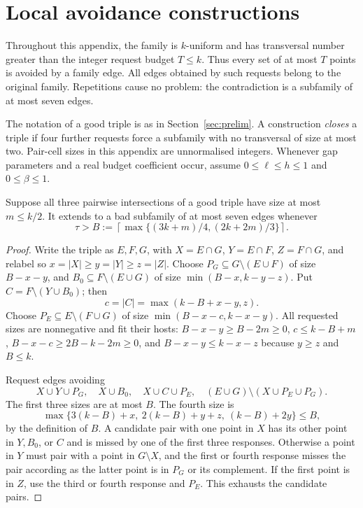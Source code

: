 \section{Local avoidance constructions}\label{app:local}
Throughout this appendix, the family is $k$-uniform and has transversal
number greater than the integer request budget $T\le k$. Thus every set
of at most $T$ points is avoided by a family edge. All edges obtained by
such requests belong to the original family. Repetitions cause no problem:
the contradiction is a subfamily of at most seven edges.

The notation of a good triple is as in Section~\ref{sec:prelim}.
A construction \emph{closes} a triple if four further requests force a
subfamily with no transversal of size at most two. Pair-cell sizes in
this appendix are unnormalised integers. Whenever gap parameters and a
real budget coefficient occur, assume $0\le\ell\le h\le1$ and
$0\le\beta\le1$.

\begin{lemma}\label{lem:smalltriple}
Suppose all three pairwise intersections of a good triple have size at most $m\le k/2$. It extends to a bad subfamily of at most seven edges whenever
\[
\tau>B:=\left\lceil\max\{(3k+m)/4,(2k+2m)/3\}\right\rceil.
\]
\end{lemma}
\begin{proof}
Write the triple as $E,F,G$, with $X=E\cap G$, $Y=E\cap F$, $Z=F\cap G$, and relabel so $x=|X|\ge y=|Y|\ge z=|Z|$. Choose $P_G\subseteq G\setminus(E\cup F)$ of size $B-x-y$, and $B_0\subseteq F\setminus(E\cup G)$ of size $\min(B-x,k-y-z)$. Put $C=F\setminus(Y\cup B_0)$; then
\[
c=|C|=\max(k-B+x-y,z).
\]
Choose $P_E\subseteq E\setminus(F\cup G)$ of size $\min(B-x-c,k-x-y)$. All requested sizes are nonnegative and fit their hosts: $B-x-y\ge B-2m\ge0$, $c\le k-B+m$, $B-x-c\ge2B-k-2m\ge0$, and $B-x-y\le k-x-z$ because $y\ge z$ and $B\le k$.

Request edges avoiding
\[
X\cup Y\cup P_G,\quad X\cup B_0,\quad X\cup C\cup P_E,\quad (E\cup G)\setminus(X\cup P_E\cup P_G).
\]
The first three sizes are at most $B$. The fourth size is
\[
\max\{3(k-B)+x,\ 2(k-B)+y+z,\ (k-B)+2y\}\le B,
\]
by the definition of $B$.
A candidate pair with one point in $X$ has its other point in $Y,B_0$, or $C$ and is missed by one of the first three responses. Otherwise a point in $Y$ must pair with a point in $G\setminus X$, and the first or fourth response misses the pair according as the latter point is in $P_G$ or its complement. If the first point is in $Z$, use the third or fourth response and $P_E$. This exhausts the candidate pairs.
\end{proof}


